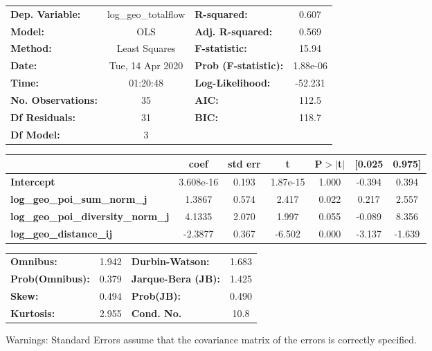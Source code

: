 \begin{center}
\begin{tabular}{lclc}
\toprule
\textbf{Dep. Variable:}                    & log\_geo\_totalflow & \textbf{  R-squared:         } &     0.607   \\
\textbf{Model:}                            &         OLS         & \textbf{  Adj. R-squared:    } &     0.569   \\
\textbf{Method:}                           &    Least Squares    & \textbf{  F-statistic:       } &     15.94   \\
\textbf{Date:}                             &   Tue, 14 Apr 2020  & \textbf{  Prob (F-statistic):} &  1.88e-06   \\
\textbf{Time:}                             &       01:20:48      & \textbf{  Log-Likelihood:    } &   -52.231   \\
\textbf{No. Observations:}                 &            35       & \textbf{  AIC:               } &     112.5   \\
\textbf{Df Residuals:}                     &            31       & \textbf{  BIC:               } &     118.7   \\
\textbf{Df Model:}                         &             3       & \textbf{                     } &             \\
\bottomrule
\end{tabular}
\begin{tabular}{lcccccc}
                                           & \textbf{coef} & \textbf{std err} & \textbf{t} & \textbf{P$> |$t$|$} & \textbf{[0.025} & \textbf{0.975]}  \\
\midrule
\textbf{Intercept}                         &    3.608e-16  &        0.193     &  1.87e-15  &         1.000        &       -0.394    &        0.394     \\
\textbf{log\_geo\_poi\_sum\_norm\_j}       &       1.3867  &        0.574     &     2.417  &         0.022        &        0.217    &        2.557     \\
\textbf{log\_geo\_poi\_diversity\_norm\_j} &       4.1335  &        2.070     &     1.997  &         0.055        &       -0.089    &        8.356     \\
\textbf{log\_geo\_distance\_ij}            &      -2.3877  &        0.367     &    -6.502  &         0.000        &       -3.137    &       -1.639     \\
\bottomrule
\end{tabular}
\begin{tabular}{lclc}
\textbf{Omnibus:}       &  1.942 & \textbf{  Durbin-Watson:     } &    1.683  \\
\textbf{Prob(Omnibus):} &  0.379 & \textbf{  Jarque-Bera (JB):  } &    1.425  \\
\textbf{Skew:}          &  0.494 & \textbf{  Prob(JB):          } &    0.490  \\
\textbf{Kurtosis:}      &  2.955 & \textbf{  Cond. No.          } &     10.8  \\
\bottomrule
\end{tabular}
\end{center}

Warnings: \newline
 [1] Standard Errors assume that the covariance matrix of the errors is correctly specified.